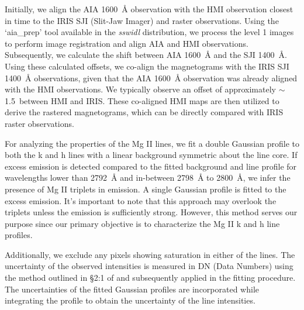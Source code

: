 Initially, we align the AIA 1600~{\AA} observation with the HMI observation closest in time to the IRIS SJI (Slit-Jaw Imager) and raster observations. Using the `aia\_prep' tool available in the \textit{sswidl} distribution, we process the level 1 images to perform image registration and align AIA and HMI observations. Subsequently, we calculate the shift between AIA 1600~{\AA} and the SJI 1400~{\AA}. Using these calculated offsets, we co-align the magnetograms with the IRIS SJI 1400~{\AA} observations, given that the AIA 1600~{\AA} observation was already aligned with the HMI observations. We typically observe an offset of approximately $\sim$ 1.5\arcsec~between HMI and IRIS. These co-aligned HMI maps are then utilized to derive the rastered magnetograms, which can be directly compared with IRIS raster observations.

For analyzing the properties of the Mg II lines, we fit a double Gaussian profile to both the k and h lines with a linear background symmetric about the line core. If excess emission is detected compared to the fitted background and line profile for wavelengths lower than 2792~{\AA} and in-between 2798~{\AA} to 2800~{\AA}, we infer the presence of Mg II triplets in emission. A single Gaussian profile is fitted to the excess emission. It's important to note that this approach may overlook the triplets unless the emission is sufficiently strong. However, this method serves our purpose since our primary objective is to characterize the Mg II k and h line profiles.

Additionally, we exclude any pixels showing saturation in either of the lines. The uncertainty of the observed intensities is measured in DN (Data Numbers) using the method outlined in \S 2:1 of \cite{kerr15} and subsequently applied in the fitting procedure. The uncertainties of the fitted Gaussian profiles are incorporated while integrating the profile to obtain the uncertainty of the line intensities.

